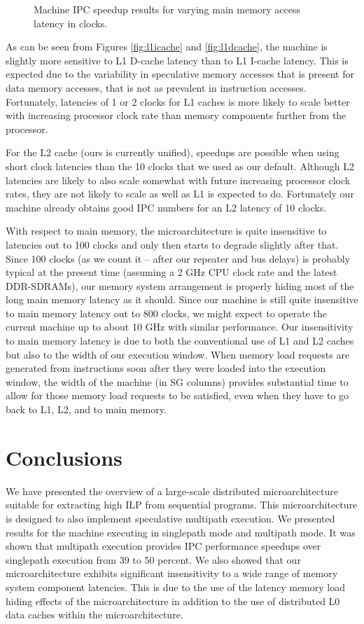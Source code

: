 \documentclass[10pt,twocolumn,dvips]{article}
\begin{document}
%
\begin{figure}
\centering
{}
\caption{Machine IPC speedup results for varying 
main memory access latency in clocks.}
\label{fig:dram}
\end{figure}
%
As can be seen from Figures \ref{fig:l1icache} and \ref{fig:l1dcache},
the machine is slightly more sensitive to L1 D-cache latency
than to L1 I-cache latency.  This is expected due to the
variability in speculative memory accesses that is present for 
data memory accesses,
that is not as prevalent in instruction accesses.
Fortunately, latencies of 1 or 2 clocks
for L1 caches is more likely to scale better with increasing
processor clock rate than memory components further from the processor.

For the L2 cache (ours is currently unified), speedups are
possible when using short clock latencies than the 10 clocks that
we used as our default.
Although L2 latencies are likely to also scale somewhat
with future increasing processor clock rates, they are not likely
to scale as well as L1 is expected to do.
Fortunately our machine already obtains good IPC numbers
for an L2 latency of 10 clocks. 

With respect to main memory, the microarchitecture
is quite insensitive to latencies out to 100 clocks and
only then starts to degrade slightly after that.  
Since 100 clocks
(as we count it -- after our repeater and bus delays)
is probably typical at the present time (assuming a 2 GHz
CPU clock rate and the latest DDR-SDRAMs), our memory system
arrangement is properly hiding most of the long main memory latency as it
should.  
Since our machine is still quite insensitive to
main memory latency out to 800 clocks, we might expect to
operate the current machine up to about 10 GHz with similar performance.
Our insensitivity to main memory latency is due to both the conventional
use of L1 and L2 caches but also to the width of our execution window.
When memory load requests are generated from instructions
soon after they were loaded into
the execution window, the width of the machine (in SG columns) provides
substantial time to allow for those memory load requests to
be satisfied, even when they have to go back to L1, L2, and to
main memory.
%
%
\section{Conclusions}
%
We have presented the overview of a large-scale distributed 
microarchitecture suitable for extracting high ILP from
sequential programs.
This microarchitecture is designed to also implement 
speculative multipath execution.  We presented results
for the machine executing in singlepath mode and 
multipath mode.
It was shown that multipath execution provides IPC performance speedups
over singlepath execution from 39 to 50 percent.
We also showed that our microarchitecture exhibits significant
insensitivity to a wide range of memory system component latencies.
This is due to the use of the latency memory load hiding effects
of the microarchitecture in addition to the use of distributed
L0 data caches within the microarchitecture.
%


%
\end{document}
